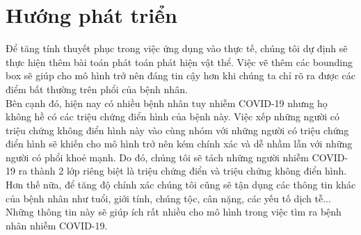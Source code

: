 \documentclass{article}
\begin{document}
\section{Hướng phát triển}
Để tăng tính thuyết phục trong việc ứng dụng vào thực tế, chúng tôi dự định sẽ thực hiện thêm bài toán phát toán phát hiện vật thể. Việc vẽ thêm các bounding box sẽ giúp cho mô hình trở nên đáng tin cậy hơn khi chúng ta chỉ rõ ra được các điểm bất thường trên phổi của bệnh nhân.\\

Bên cạnh đó, hiện nay có nhiều bệnh nhân tuy nhiễm COVID-19 nhưng họ không hề có các triệu chứng điển hình của bệnh này. Việc xếp những người có triệu chứng không điển hình này vào cùng nhóm với những người có triệu chứng điển hình sẽ khiến cho mô hình trở nên kém chính xác và dễ nhầm lẫn với những người có phổi khoẻ mạnh. Do đó, chúng tôi sẽ tách những người nhiễm COVID-19 ra thành 2 lớp riêng biệt là triệu chứng điển và triệu chứng không điển hình.\\

Hơn thế nữa, để tăng độ chính xác chúng tôi cũng sẽ tận dụng các thông tin khác của bệnh nhân như tuổi, giới tính, chúng tộc, cân nặng, các yếu tố dịch tễ... Những thông tin này sẽ giúp ích rất nhiều cho mô hình trong việc tìm ra bệnh nhân nhiễm COVID-19.

\newpage
\medskip

\end{document}
